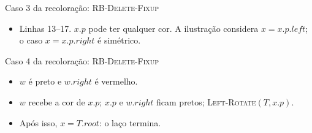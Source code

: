 \documentclass[aspectratio=169,10pt]{beamer}
\newcommand{\proc}[1]{\textnormal{\rmfamily\textsc{#1}}}
\newcommand{\at}[1]{.\mathit{#1}}
\begin{document}
\begin{frame}{Caso 3 da recoloração: \proc{RB-Delete-Fixup}}
  \vspace{2mm}
  \begin{itemize}
    \item Linhas 13--17. $x\at{p}$ pode ter qualquer cor. A ilustração considera $x = x\at{p}\at{left}$; o caso $x = x\at{p}\at{right}$ é simétrico.
  \end{itemize}
\end{frame}

\begin{frame}{Caso 4 da recoloração: \proc{RB-Delete-Fixup}}
  \begin{itemize}
    \item $w$ é \alert{preto} e $w\at{right}$ é \alert{vermelho}.
    \item $w$ recebe a cor de $x\at{p}$; $x\at{p}$ e $w\at{right}$ ficam pretos; \proc{Left-Rotate}$(T, x\at{p})$.
    \item Após isso, $x = T\at{root}$: o laço termina.
  \end{itemize}


\end{frame}
\end{document}
